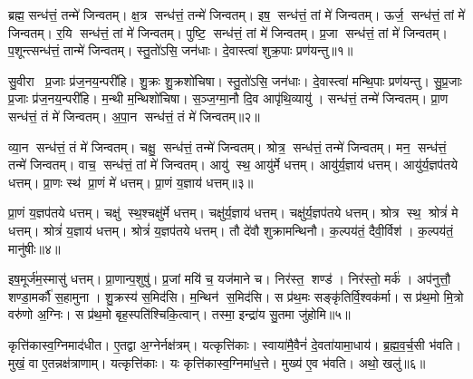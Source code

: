 \setcounter{anuvakam}{0}

ब्रह्म॒ सन्ध॑त्तं॒ तन्मे॑ जिन्वतम्।
क्ष॒त्र सन्ध॑त्तं॒ तन्मे॑ जिन्वतम्।
इष॒ सन्ध॑त्तं॒ तां मे॑ जिन्वतम्।
ऊर्ज॒ सन्ध॑त्तं॒ तां मे॑ जिन्वतम्।
र॒यि सन्ध॑त्तं॒ तां मे॑ जिन्वतम्।
पुष्टि॒ सन्ध॑त्तं॒ तां मे॑ जिन्वतम्।
प्र॒जा सन्ध॑त्तं॒ तां मे॑ जिन्वतम्।
प॒शून्त्सन्ध॑त्तं॒ तान्मे॑ जिन्वतम्।
स्तु॒तो॑ऽसि॒ जन॑धाः।
दे॒वास्त्वा॑ शुक्र॒पाः प्रण॑यन्तु॥१॥

सु॒वीरा प्र॒जाः प्र॑ज॒नय॒न्परी॑हि।
शु॒क्रः शु॒क्रशो॑चिषा।
स्तु॒तो॑ऽसि॒ जन॑धाः।
दे॒वास्त्वा॑ मन्थि॒पाः प्रण॑यन्तु।
सु॒प्र॒जाः प्र॒जाः प्र॑ज॒नय॒न्परी॑हि।
म॒न्थी म॒न्थिशो॑चिषा।
स॒ञ्ज॒ग्मा॒नौ दि॒व आपृ॑थि॒व्यायु॑।
सन्ध॑त्तं॒ तन्मे॑ जिन्वतम्।
प्रा॒ण सन्ध॑त्तं॒ तं मे॑ जिन्वतम्।
अ॒पा॒न सन्ध॑त्तं॒ तं मे॑ जिन्वतम्॥२॥

व्या॒न सन्ध॑त्तं॒ तं मे॑ जिन्वतम्।
चक्षु॒ सन्ध॑त्तं॒ तन्मे॑ जिन्वतम्।
श्रोत्र॒ सन्ध॑त्तं॒ तन्मे॑ जिन्वतम्।
मन॒ सन्ध॑त्तं॒ तन्मे॑ जिन्वतम्।
वाच॒ सन्ध॑त्तं॒ तां मे॑ जिन्वतम्।
आयु॑ स्थ॒ आयु॑र्मे धत्तम्।
आयु॑र्य॒ज्ञाय॑ धत्तम्।
आयु॑र्य॒ज्ञप॑तये धत्तम्।
प्रा॒णः स्थ॑ प्रा॒णं मे॑ धत्तम्।
प्रा॒णं य॒ज्ञाय॑ धत्तम्॥३॥

प्रा॒णं य॒ज्ञप॑तये धत्तम्।
चक्षु॑ स्थ॒श्चक्षु॑र्मे धत्तम्।
चक्षु॑र्य॒ज्ञाय॑ धत्तम्।
चक्षु॑र्य॒ज्ञप॑तये धत्तम्।
श्रोत्र स्थ॒ श्रोत्रं॑ मे धत्तम्।
श्रोत्रं॑ य॒ज्ञाय॑ धत्तम्।
श्रोत्रं॑ य॒ज्ञप॑तये धत्तम्।
तौ दे॑वौ शुक्रामन्थिनौ।
क॒ल्पय॑तं॒ दैवी॒र्विश॑।
क॒ल्पय॑तं॒ मानु॑षीः॥४॥

इष॒मूर्ज॑म॒स्मासु॑ धत्तम्।
प्रा॒णान्प॒शुषु॑।
प्र॒जां मयि॑ च॒ यज॑माने च।
निर॑स्त॒ शण्ड॑।
निर॑स्तो॒ मर्क॑।
अप॑नुत्तौ॒ शण्डा॒मर्कौ॑ स॒हामुना।
शु॒क्रस्य॑ स॒मिद॑सि।
म॒न्थिन॑ स॒मिद॑सि।
स प्र॑थ॒मः सङ्कृ॑तिर्वि॒श्वक॑र्मा।
स प्र॑थ॒मो मि॒त्रो वरु॑णो अ॒ग्निः।
स प्र॑थ॒मो बृह॒स्पति॑श्चिकि॒त्वान्।
तस्मा॒ इन्द्रा॑य सु॒तमा जु॑होमि॥५॥\anuvakamend[न॒य॒न्त्व॒पा॒न सन्ध॑त्तं॒ तं मे॑ जिन्वतं प्रा॒णं य॒ज्ञाय॑ धत्तं॒ मानु॑षीर॒ग्निर्द्वे च॑॥ (ब्रह्म॑ क्ष॒त्रं तदिष॒मूर्ज र॒यिं पुष्टिं॑ प्र॒जां तां प॒शून्तान्त्सन्ध॑त्तं॒ तत्प्रा॒णम॑पा॒नं व्या॒नं तं चक्षु॒ श्रोत्रं॒ मन॒स्तद्वाचं॒ ताम्।
इ॒षादि॒पञ्च॑के॒ वाचं॒ तां मे॑ प॒शून्त्सन्ध॑त्तं॒ तान्मे प्रा॒णादि॒त्रित॑ये॒ तं मे॒ऽन्यत्र॒ तन्मे)]

कृत्ति॑कास्व॒ग्निमाद॑धीत।
ए॒तद्वा अ॒ग्नेर्नक्ष॑त्रम्।
यत्कृत्ति॑काः।
स्वाया॑मै॒वैनं॑ दे॒वता॑यामा॒धाय॑।
ब्र॒ह्म॒व॒र्च॒सी भ॑वति।
मुखं॒ वा ए॒तन्नक्ष॑त्राणाम्।
यत्कृत्ति॑काः।
यः कृत्ति॑कास्व॒ग्निमा॑ध॒त्ते।
मुख्य॑ ए॒व भ॑वति।
अथो॒ खलु॑॥६॥

